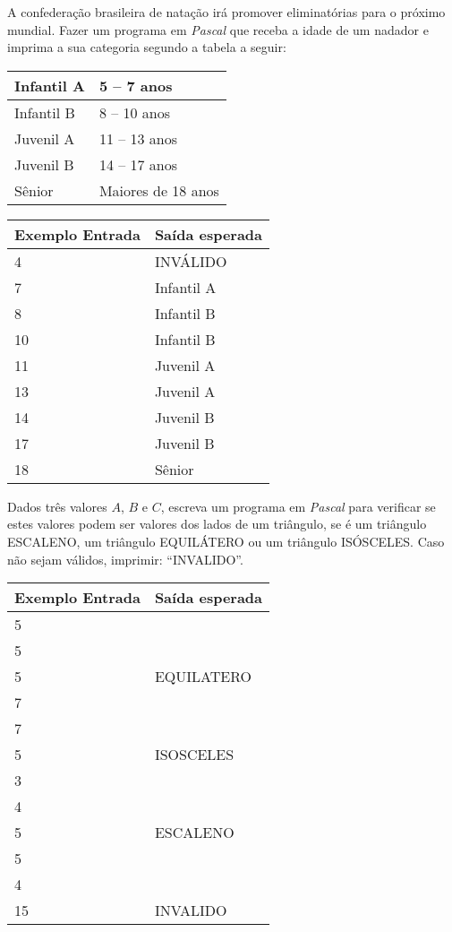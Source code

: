 \item A confederação brasileira de natação irá promover eliminatórias para o próximo mundial. Fazer um programa em \emph{Pascal} que receba a idade de um nadador e imprima a sua categoria segundo a tabela a seguir:

\begin{tabular}{|l|l|} \hline
Infantil A & 5 -- 7 anos \\ \hline
Infantil B & 8 -- 10 anos  \\ \hline
Juvenil A & 11 -- 13 anos \\ \hline
Juvenil B & 14 -- 17 anos \\ \hline
Sênior &  Maiores de 18 anos \\ \hline
\end{tabular}

\begin{center}
\begin{tabular}{|l|l|} \hline
Exemplo Entrada & Saída esperada \\ \hline
4 & INVÁLIDO \\ \hline
7 & Infantil A \\ \hline
8 & Infantil B \\ \hline
10 & Infantil B \\ \hline
11 & Juvenil A \\ \hline
13 & Juvenil A \\ \hline
14 & Juvenil B \\ \hline
17 & Juvenil B \\ \hline
18 & Sênior \\ \hline
\end{tabular}
\end{center}

\item Dados três valores $A$, $B$ e $C$, escreva um programa em \emph{Pascal} 
para verificar se estes valores podem ser valores dos lados de um triângulo, 
se é um triângulo ESCALENO, um triângulo EQUILÁTERO ou um triângulo ISÓSCELES. 
Caso não sejam válidos, imprimir: ``INVALIDO''.

\begin{center}
\begin{tabular}{|l|l|} \hline
Exemplo Entrada & Saída esperada \\ \hline
5 & \\
5 & \\
5 & EQUILATERO \\ \hline
7 & \\
7 & \\
5 & ISOSCELES \\ \hline
3 & \\
4 & \\
5 & ESCALENO \\ \hline
5 & \\
4 & \\
15 & INVALIDO \\ \hline
\end{tabular}
\end{center}

